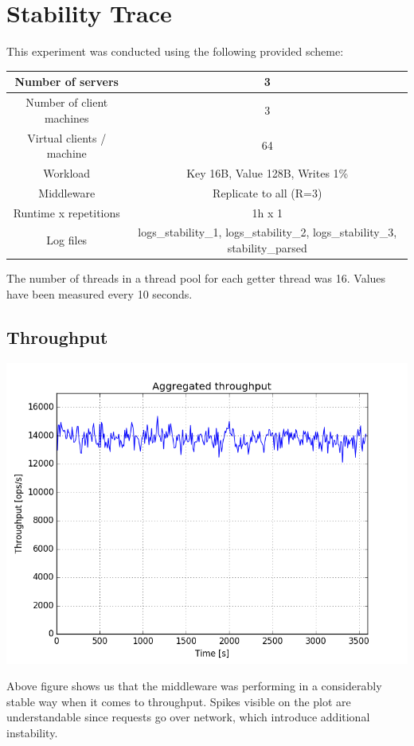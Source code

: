 \documentclass[11pt]{article}
\begin{document}
\section{Stability Trace}\label{sec:trace}

This experiment was conducted using the following provided scheme:
\medskip

\small{
\smallskip
\begin{tabular}{|c|c|}
\hline Number of servers & 3 \\ 
\hline Number of client machines & 3 \\ 
\hline Virtual clients / machine &  64 \\ 
\hline Workload & Key 16B, Value 128B, Writes 1\% \\
\hline Middleware & Replicate to all (R=3) \\ 
\hline Runtime x repetitions & 1h x 1 \\ 
\hline Log files & logs\_stability\_1, logs\_stability\_2, logs\_stability\_3, stability\_parsed \\
\hline 
\end{tabular} }
\medskip

The number of threads in a thread pool for each getter thread was 16. Values have been measured every 10 seconds.

\subsection{Throughput}
\includegraphics[scale=0.7]{stability_throughput.png}

Above figure shows us that the middleware was performing in a considerably stable way when it comes to throughput. Spikes visible on the plot are understandable since requests go over network, which introduce additional instability.
\end{document}
